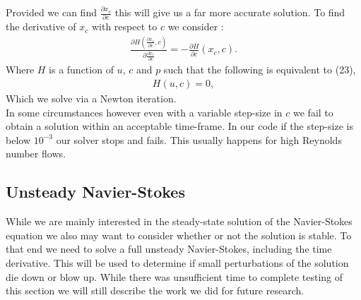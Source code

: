 \documentclass[11pt,twoside,a4paper]{article}
\begin{document}
Provided we can find $\frac{\partial x_c}{\partial c}$ this will give us a far more accurate solution.
To find the derivative of $x_c$ with respect to $c$ we consider :\\
\begin{align}
\frac{\partial H (\frac{\partial x_c}{\partial c},c)}{\partial \frac{\partial x_c}{\partial c}}  = - \frac{\partial H}{\partial c}(x_c,c) .
\end{align}
Where $H$ is a function of $u$, $c$ and $p$ such that the following is equivalent to (23),
\begin{align*}
H(u,c) = 0 ,
\end{align*}
Which we solve via a Newton iteration.\\
In some circumstances however even with a variable step-size in $c$ we fail to obtain a solution within an acceptable time-frame. In our code if the step-size is below $10^{-3}$ our solver stops and fails. This usually happens for high Reynolds number flows.

\subsection{Unsteady Navier-Stokes}

While we are mainly interested in the steady-state solution of the Navier-Stokes equation we also may want to consider whether or not the solution is stable. To that end we need to solve a full unsteady Navier-Stokes, including the time derivative. This will be used to determine if small perturbations of the solution die down or blow up. While there was unsufficient time to complete testing of this section we will still describe the work we did for future research.
\end{document}

